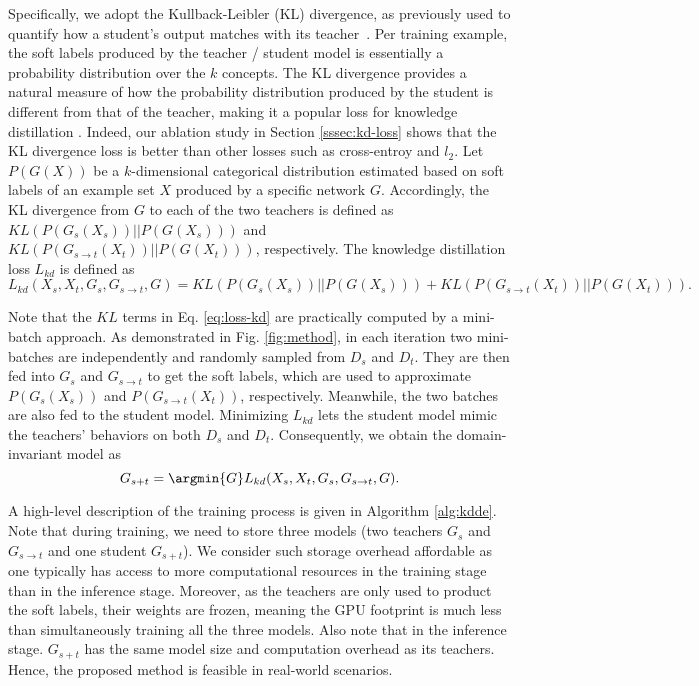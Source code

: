 Specifically, we adopt the Kullback-Leibler (KL) divergence, as previously used to quantify how a student's output matches with its teacher~\cite{nips15-kd,zhang2018deep_mutual}. Per training example, the soft labels produced by the teacher / student model is essentially a probability distribution over the $k$ concepts. The KL divergence provides a natural measure of how the probability distribution produced by the student is different from that of the teacher, making it a popular loss for knowledge distillation \cite{nips15-kd,zhang2018deep_mutual,mirzadeh2020improved,tian2019contrastive,goldblum2020adversarially,zhang2019your,shi2019knowledge}. Indeed, our ablation study in Section \ref{sssec:kd-loss} shows that the KL divergence loss is better than other losses such as cross-entroy and $l_2$. Let $P(G(X))$ be a $k$-dimensional categorical distribution estimated based on soft labels of an example set $X$ produced by a specific network $G$. Accordingly, the KL divergence from $G$ to each of the two teachers is defined as $KL(P(G_s(X_s)) || P(G(X_s)))$ and $KL(P(G_{s\rightarrow t}(X_t)) || P(G(X_t)))$, respectively. 
The knowledge distillation loss $L_{kd}$ is defined as 
\begin{equation} \label{eq:loss-kd}
L_{kd}(X_s, X_t, G_s, G_{s\rightarrow t}, G) = KL(P(G_s(X_s)) || P(G(X_s)))  + KL(P(G_{s\rightarrow t}(X_t)) || P(G(X_t))).
\end{equation}

Note that the $KL$ terms in Eq. \ref{eq:loss-kd} are practically computed by a mini-batch approach. As demonstrated in Fig. \ref{fig:method}, in each iteration two mini-batches are independently and randomly sampled from $D_s$ and $D_t$. They are then fed into $G_s$ and $G_{s\rightarrow t}$ to get the soft labels, which are used to approximate $P(G_s(X_s))$ and $P(G_{s\rightarrow t}(X_t))$, respectively. Meanwhile, the two batches are also fed to the student model. Minimizing $L_{kd}$ lets the student model mimic the teachers' behaviors on both $D_s$ and $D_t$. 
Consequently, we obtain the domain-invariant model as 
\begin{equation} \label{eq:general-de}
    G_{s+t}=\argmin{G} L_{kd}(X_s, X_t, G_s, G_{s\rightarrow t}, G).
\end{equation}

A high-level description of the training process is given in Algorithm \ref{alg:kdde}. Note that during training, we need to store three models (two teachers $G_s$ and $G_{s\rightarrow t}$ and one student $G_{s+t}$). We consider such storage overhead affordable as one typically has access to more computational resources in the training stage than in the inference stage. Moreover, as the teachers are only used to product the soft labels, their weights are frozen, meaning the GPU footprint is much less than simultaneously training all the three models. Also note that in the inference stage. $G_{s+t}$ has the same model size and computation overhead as its teachers. Hence, the proposed method is feasible in real-world scenarios.

